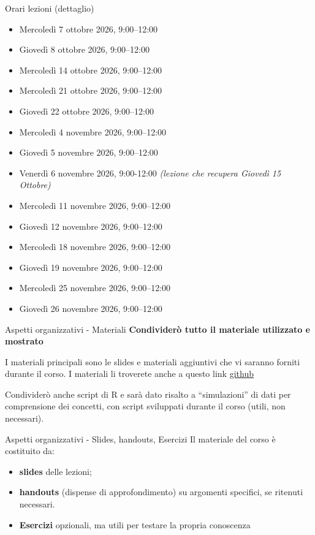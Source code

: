 \documentclass[
  ignorenonframetext,
  aspectratio=169,
]{beamer}
\providecommand{\tightlist}{%
  \setlength{\itemsep}{0pt}\setlength{\parskip}{0pt}}
\begin{document}
\begin{frame}{Orari lezioni (dettaglio)}
\label{orari-lezioni-dettaglio}
\scriptsize

\begin{itemize}
\tightlist
\item
  Mercoledì 7 ottobre 2026, 9:00--12:00
\item
  Giovedì 8 ottobre 2026, 9:00--12:00
\item
  Mercoledì 14 ottobre 2026, 9:00--12:00
\item
  Mercoledì 21 ottobre 2026, 9:00--12:00
\item
  Giovedì 22 ottobre 2026, 9:00--12:00
\item
  Mercoledì 4 novembre 2026, 9:00--12:00
\item
  Giovedì 5 novembre 2026, 9:00--12:00
\item
  Venerdì 6 novembre 2026, 9:00-12:00 \emph{(lezione che recupera
  Giovedì 15 Ottobre)}
\item
  Mercoledì 11 novembre 2026, 9:00--12:00
\item
  Giovedì 12 novembre 2026, 9:00--12:00
\item
  Mercoledì 18 novembre 2026, 9:00--12:00
\item
  Giovedì 19 novembre 2026, 9:00--12:00
\item
  Mercoledì 25 novembre 2026, 9:00--12:00
\item
  Giovedì 26 novembre 2026, 9:00--12:00
\end{itemize}
\end{frame}

\begin{frame}{Aspetti organizzativi - Materiali}
\label{aspetti-organizzativi---materiali}
\textbf{Condividerò tutto il materiale utilizzato e mostrato}

I materiali principali sono le slides e materiali aggiuntivi che vi saranno forniti durante il corso. I materiali li troverete anche a questo link \href{https://github.com/giorgioarcara/Slides-Metodi-Statistici-Neuropsi-Forense}{\underline{github}}

Condividerò anche script di R e sarà dato risalto a ``simulazioni'' di
dati per comprensione dei concetti, con script sviluppati durante il
corso (utili, non necessari).
\end{frame}

\begin{frame}{Aspetti organizzativi - Slides, handouts, Esercizi}
\label{aspetti-organizzativi---slides-handouts-esercizi}
Il materiale del corso è costituito da:

\begin{itemize}
\tightlist
\item
  \textbf{slides} delle lezioni;
\item
  \textbf{handouts} (dispense di approfondimento) su argomenti
  specifici, se ritenuti necessari.
\item
  \textbf{Esercizi} opzionali, ma utili per testare la propria
  conoscenza
\end{itemize}
\end{frame}
\end{document}
